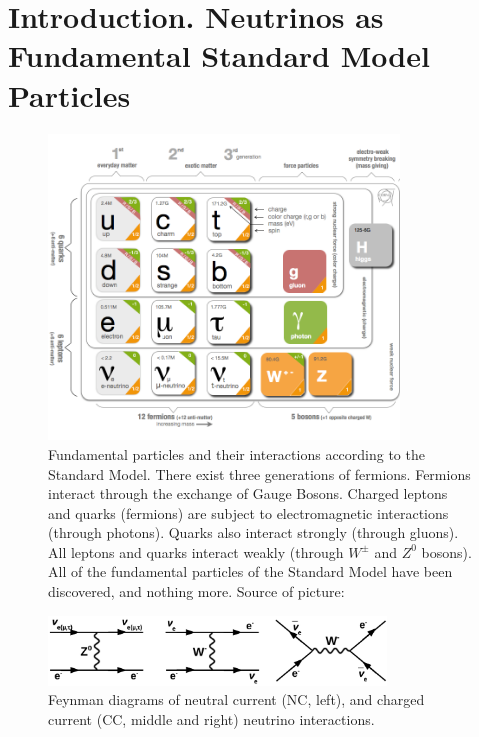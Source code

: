 \section{Introduction. Neutrinos as Fundamental Standard Model Particles}
\begin{figure}
\caption{Fundamental particles and their interactions according to the Standard Model. There exist three generations of fermions. Fermions interact through the exchange of Gauge Bosons. Charged leptons and quarks (fermions) are subject to electromagnetic interactions (through photons). Quarks also interact strongly (through gluons). All leptons and quarks interact weakly (through $W^{\pm}$ and $Z^0$ bosons). All of the fundamental particles of the Standard Model have been discovered, and nothing more. Source of picture: \cite{ref_fig_StandardModel}}
\label{fig:StandardModel}
\centering 
\includegraphics[width=0.83\textwidth, keepaspectratio=true]{figs/StandardModel.png}
\end{figure}
\begin{figure}
\caption{Feynman diagrams of neutral current (NC, left), and charged current (CC, middle and right) neutrino interactions.}
\label{fig:NuScattering}
\centering
\includegraphics[width=0.80\textwidth, keepaspectratio=true]{figs/neutrinoScattering.png}
\end{figure}
